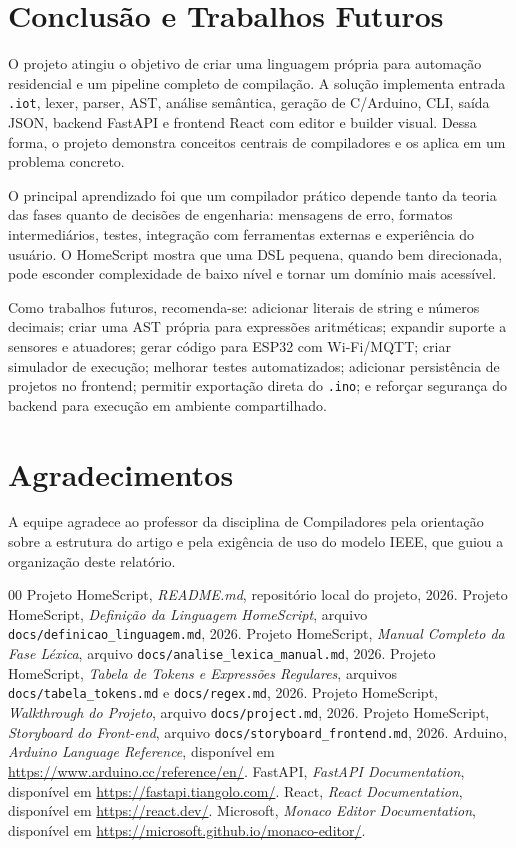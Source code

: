 \documentclass[conference]{IEEEtran}
\begin{document}
\section{Conclusão e Trabalhos Futuros}
O projeto atingiu o objetivo de criar uma linguagem própria para automação residencial e um pipeline completo de compilação. A solução implementa entrada \texttt{.iot}, lexer, parser, AST, análise semântica, geração de C/Arduino, CLI, saída JSON, backend FastAPI e frontend React com editor e builder visual. Dessa forma, o projeto demonstra conceitos centrais de compiladores e os aplica em um problema concreto.

O principal aprendizado foi que um compilador prático depende tanto da teoria das fases quanto de decisões de engenharia: mensagens de erro, formatos intermediários, testes, integração com ferramentas externas e experiência do usuário. O HomeScript mostra que uma DSL pequena, quando bem direcionada, pode esconder complexidade de baixo nível e tornar um domínio mais acessível.

Como trabalhos futuros, recomenda-se: adicionar literais de string e números decimais; criar uma AST própria para expressões aritméticas; expandir suporte a sensores e atuadores; gerar código para ESP32 com Wi-Fi/MQTT; criar simulador de execução; melhorar testes automatizados; adicionar persistência de projetos no frontend; permitir exportação direta do \texttt{.ino}; e reforçar segurança do backend para execução em ambiente compartilhado.

\section*{Agradecimentos}
A equipe agradece ao professor da disciplina de Compiladores pela orientação sobre a estrutura do artigo e pela exigência de uso do modelo IEEE, que guiou a organização deste relatório.

\balance
\begin{thebibliography}{00}
 Projeto HomeScript, \textit{README.md}, repositório local do projeto, 2026.
 Projeto HomeScript, \textit{Definição da Linguagem HomeScript}, arquivo \texttt{docs/definicao\_linguagem.md}, 2026.
 Projeto HomeScript, \textit{Manual Completo da Fase Léxica}, arquivo \texttt{docs/analise\_lexica\_manual.md}, 2026.
 Projeto HomeScript, \textit{Tabela de Tokens e Expressões Regulares}, arquivos \texttt{docs/tabela\_tokens.md} e \texttt{docs/regex.md}, 2026.
 Projeto HomeScript, \textit{Walkthrough do Projeto}, arquivo \texttt{docs/project.md}, 2026.
 Projeto HomeScript, \textit{Storyboard do Front-end}, arquivo \texttt{docs/storyboard\_frontend.md}, 2026.
 Arduino, \textit{Arduino Language Reference}, disponível em \url{https://www.arduino.cc/reference/en/}.
 FastAPI, \textit{FastAPI Documentation}, disponível em \url{https://fastapi.tiangolo.com/}.
 React, \textit{React Documentation}, disponível em \url{https://react.dev/}.
 Microsoft, \textit{Monaco Editor Documentation}, disponível em \url{https://microsoft.github.io/monaco-editor/}.
\end{thebibliography}
\end{document}
